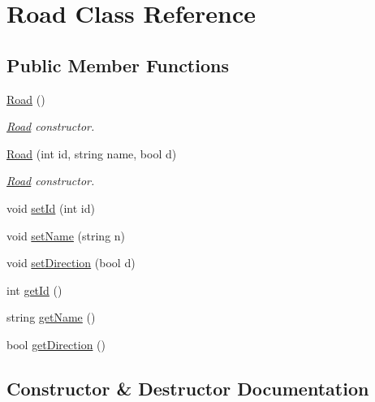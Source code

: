 \hypertarget{class_road}{}\section{Road Class Reference}
\label{class_road}
\subsection*{Public Member Functions}
\begin{DoxyCompactItemize}
\item 
\mbox{\label{class_road_a90bb6be2a5c3b6997849a915e2af0cf0}} 
\hyperlink{class_road_a90bb6be2a5c3b6997849a915e2af0cf0}{Road} ()
\begin{DoxyCompactList}\small\item\em \hyperlink{class_road}{Road} constructor. \end{DoxyCompactList}\item 
\hyperlink{class_road_ab6851fb8945d7dab146c21c188e60255}{Road} (int id, string name, bool d)
\begin{DoxyCompactList}\small\item\em \hyperlink{class_road}{Road} constructor. \end{DoxyCompactList}\item 
void \hyperlink{class_road_abb20db3e412a088553dfacc862bb9f32}{set\+Id} (int id)
\item 
void \hyperlink{class_road_a393229b6ac7fd30dfd3280741d40008a}{set\+Name} (string n)
\item 
void \hyperlink{class_road_a3df961399de73d0278ad1ff76dc0e886}{set\+Direction} (bool d)
\item 
int \hyperlink{class_road_a8a0a359a444afd620a30f33455b1808e}{get\+Id} ()
\item 
string \hyperlink{class_road_a900c77eae1c7adc71f2a0a4afd2fb904}{get\+Name} ()
\item 
bool \hyperlink{class_road_aec1bedfd4d4e31b20a46d90c3f6a6b6a}{get\+Direction} ()
\end{DoxyCompactItemize}


\subsection{Constructor \& Destructor Documentation}
\mbox{\label{class_road_ab6851fb8945d7dab146c21c188e60255}} 
